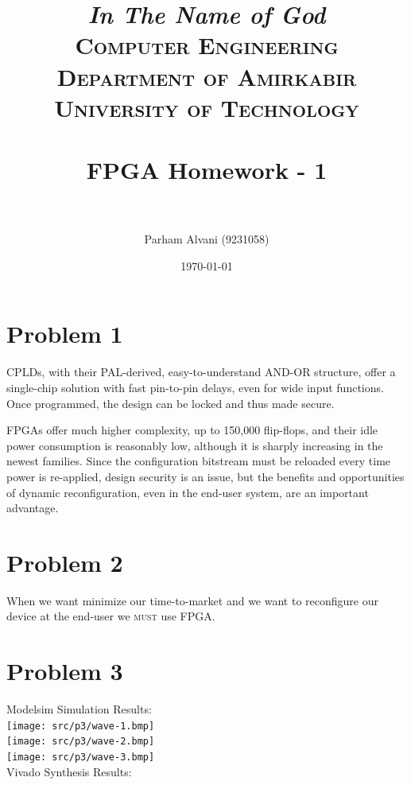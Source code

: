 \documentclass[paper=a4, fontsize=11pt]{scrartcl} %
\title{	
\normalfont \normalsize
\textit{In The Name of God} \\
\textsc{Computer Engineering Department of Amirkabir University of Technology} \\ [25pt]
\horrule{0.5pt} \\[0.4cm] %
\huge FPGA Homework - 1 \\ %
\horrule{2pt} \\[0.5cm] %
}
\author{Parham Alvani (9231058)}
\date{\normalsize\today}
\numberwithin{equation}{section} %
\numberwithin{figure}{section} %
\numberwithin{table}{section} %
\begin{document}
\maketitle


\section{Problem 1}
\par CPLDs, with their PAL-derived, easy-to-understand AND-OR structure,
offer a single-chip solution with fast pin-to-pin delays,
even for wide input functions.
Once programmed, the design can be locked and thus made secure.
\par FPGAs offer much higher complexity, up to 150,000 flip-flops, and their idle power consumption is reasonably low,
although it is sharply increasing in the newest families.
Since the configuration bitstream must be reloaded every time power is re-applied,
design security is an issue, but the benefits and opportunities of dynamic reconfiguration,
even in the end-user system, are an important advantage.


\section{Problem 2}
\par When we want minimize our time-to-market and we want to reconfigure our device at the end-user we \textsc{must}
use FPGA.


\section{Problem 3}
Modelsim Simulation Results:\\

\texttt{[image: src/p3/wave-1.bmp]}\\
\texttt{[image: src/p3/wave-2.bmp]}\\
\texttt{[image: src/p3/wave-3.bmp]}\\

Vivado Synthesis Results:\\
\end{document}
